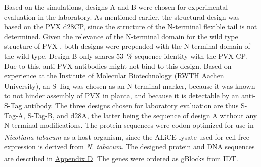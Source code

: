 Based on the simulations, designs A and B were chosen for experimental evaluation in the laboratory. As mentioned earlier, the structural design was based on the PVX d28CP, since the structure of the N-terminal flexible tail is not determined. Given the relevance of the N-terminal domain for the wild type structure of PVX \cite{del22_rigid}, both designs were prepended with the N-terminal domain of the wild type. Design B only shares \SI{53}{\percent} sequence identity with the PVX CP. Due to this, anti-PVX antibodies might not bind to this design. Based on experience at the Institute of Molecular Biotechnology (RWTH Aachen University), an S-Tag was chosen as an N-terminal marker, because it was known to not hinder assembly of PVX in planta, and because it is detectable by an anti-S-Tag antibody. The three designs chosen for laboratory evaluation are thus S-Tag-A, S-Tag-B, and d28A, the latter being the sequence of design A without any N-terminal modifications. The protein sequences were codon optimized for use in \emph{Nicotiana tabacum} as a host organism, since the ALiCE\textsuperscript{\textregistered} lysate used for cell-free expression is derived from \emph{N. tabacum}. The designed protein and DNA sequences are described in \hyperref[appendix:synthetic_seqs]{Appendix D}. The genes were ordered as gBlocks\textsuperscript{\texttrademark} from IDT. 